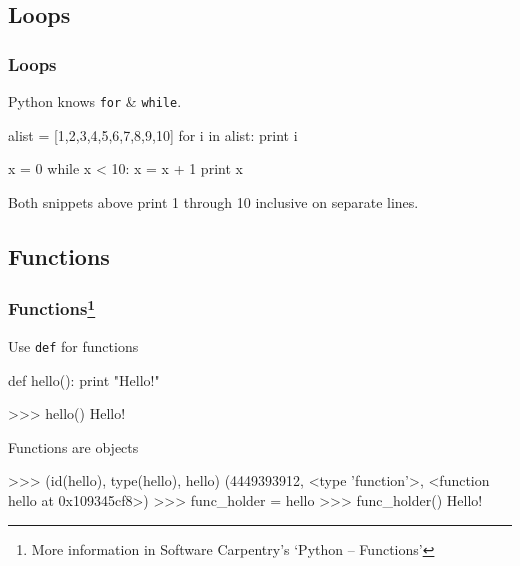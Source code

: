 \documentclass[xetex,10pt]{beamer}
\def\pythoni{\lstinline[language=pythontim]}
\def\spacer{\vspace*{1em}}
\begin{document}
\subsection{Loops}

\begin{frame}[fragile]
	\frametitle{Loops}
	Python knows \pythoni{for} \& \pythoni{while}.
	\spacer
	\pause

\begin{python}
alist = [1,2,3,4,5,6,7,8,9,10]
for i in alist:
    print i
\end{python}

	\spacer
	\pause

\begin{python}
x = 0
while x < 10:
    x = x + 1
    print x
\end{python}

	\spacer


Both snippets above print 1 through 10 inclusive on separate lines.

\end{frame}

\subsection{Functions}

\begin{frame}[fragile]
	\frametitle{Functions\footnote[frame]{More information in Software Carpentry's `Python -- Functions'}}

	Use \pythoni{def} for functions
\pause

\begin{python}
def hello():
    print "Hello!"
\end{python}
\begin{python}
>>> hello()
Hello!
\end{python}

	\spacer
\pause

Functions are objects
\begin{python}
>>> (id(hello), type(hello), hello)
(4449393912, <type 'function'>, <function hello at 0x109345cf8>)
>>> func_holder = hello
>>> func_holder()
Hello!
\end{python}
\end{frame}
\end{document}
